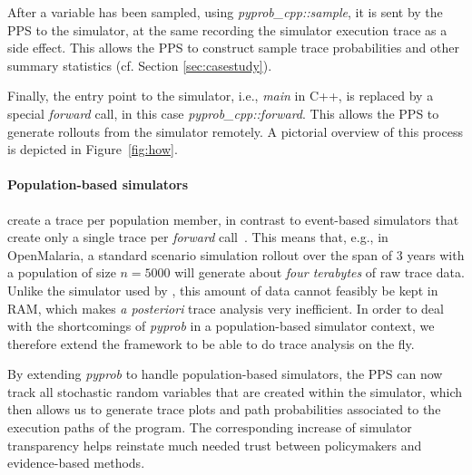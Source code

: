 \documentclass{article}
\begin{document}
After a variable has been sampled, using \textit{pyprob\_cpp::sample}, it is sent by the PPS to the simulator, at the same recording the simulator execution trace as a side effect. This allows the PPS to construct sample trace probabilities and other summary statistics (cf. Section \ref{sec:casestudy}). 

Finally, the entry point to the simulator, i.e., \textit{main} in C++, is replaced by a special \textit{forward} call, in this case \textit{pyprob\_cpp::forward}.
This allows the PPS to generate rollouts from the simulator remotely. A pictorial overview of this process is depicted in Figure~\ref{fig:how}.

\paragraph{Population-based simulators} create a trace per population member, in contrast to event-based simulators that create only a single trace per \textit{forward} call~\cite{baydin2018efficient}. This means that, e.g., in OpenMalaria, a standard scenario simulation rollout over the span of $3$ years  
with a population of size $n=5000$ \cite{smith2008towards} will generate about \textit{four terabytes} of raw trace data. Unlike the simulator used by \citet{baydin2018efficient}, this amount of data cannot feasibly be kept in RAM, which makes \textit{a posteriori} trace analysis very inefficient. 
In order to deal with the shortcomings of \textit{pyprob} in a population-based simulator context, we therefore extend the framework to be able to do trace analysis on the fly.

By extending \textit{pyprob} to handle population-based simulators, the PPS can now track all stochastic random variables that are created within the simulator, which then allows us to generate trace plots and path probabilities associated to the execution paths of the program.
The corresponding increase of simulator transparency helps reinstate much needed trust between policymakers and evidence-based methods.
\end{document}
